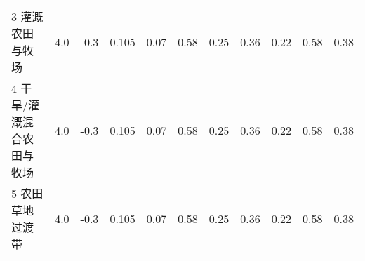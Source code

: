 \begin{landscape}
\begin{table}[htbp]
\begin{tabular}{@{}lcccccccccc@{}}
    3 灌溉农田与牧场      & 4.0        & -0.3                                                                         & 0.105                                                                                                           & 0.07                                                                                                            & 0.58                                                                                                            & 0.25                                                                                                            & 0.36                                                                                                            & 0.22                                                                                                            & 0.58                                                                                                            & 0.38                                                                                                            \\
    4 干旱/灌溉混合农田与牧场 & 4.0        & -0.3                                                                         & 0.105                                                                                                           & 0.07                                                                                                            & 0.58                                                                                                            & 0.25                                                                                                            & 0.36                                                                                                            & 0.22                                                                                                            & 0.58                                                                                                            & 0.38                                                                                                            \\
    5 农田草地过渡带      & 4.0        & -0.3                                                                         & 0.105                                                                                                           & 0.07                                                                                                            & 0.58                                                                                                            & 0.25                                                                                                            & 0.36                                                                                                            & 0.22                                                                                                            & 0.58                                                                                                            & 0.38                                                                                                            \\

\end{tabular}
\end{table}
\end{landscape}
